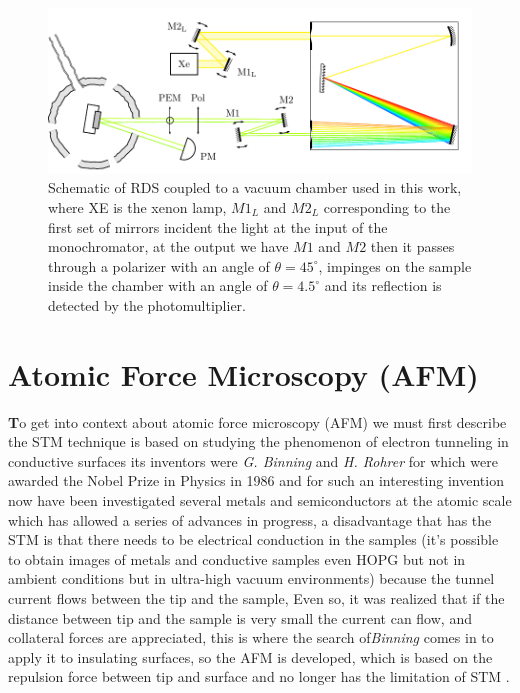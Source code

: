 \begin{figure}[H]
	\centering
	\includegraphics[width=1\linewidth]{FIGURES/Characterization_techniques/RAS-SETUP-FINE}
	\caption{Schematic of RDS coupled to a vacuum chamber used in this work, where XE is the xenon lamp, $M1_{L}$ and $M2_{L}$ corresponding to the first set of mirrors incident the light at the input of the monochromator, at the output we have $M1$ and $M2$ then it passes through a polarizer with an angle of $\theta=45^{\circ}$, impinges on the sample inside the chamber with an angle of $\theta=4.5^{\circ}$ and its reflection is detected by the photomultiplier.}
	\label{fig:ras-setup-fine}
\end{figure}



\section{Atomic Force Microscopy (AFM)}
\vspace{-1cm}
\lettrine[lines=3, lraise=0.1, nindent=0mm, slope=0mm]{\textbf{T}}{}o get into context about atomic force microscopy (AFM) \cite{binnig1982surface,binnig1986atomic} we must first describe the STM technique is based on studying the phenomenon of electron tunneling in conductive surfaces its inventors were \textit{G. Binning} and \textit{H. Rohrer} for which were awarded the Nobel Prize in Physics in 1986 and for such an interesting invention now have been investigated several metals and semiconductors \cite{cricenti2003afm,giessibl2003advances,zhong1993fractured} at the atomic scale which has allowed a series of advances in progress, a disadvantage that has the STM is that there needs to be electrical conduction in the samples (it's possible to obtain images of metals and conductive samples even HOPG but not in ambient conditions but in ultra-high vacuum environments\cite{nie1994atomic}) because the tunnel current flows between the tip and the sample, Even so, it was realized that if the distance between tip and the sample is very small the current can flow, and collateral forces are appreciated, this is where the search of\textit{Binning} comes in to apply it to insulating surfaces, so the AFM is developed, which is based on the repulsion force between tip and surface and no longer has the limitation of STM \cite{binnig1982surface}.\\

